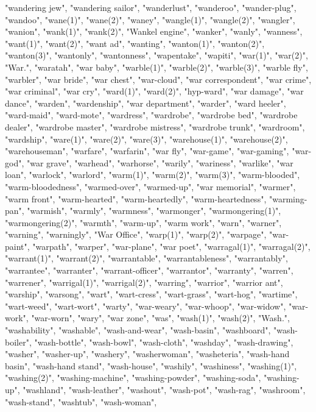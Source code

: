 "wandering jew",
"wandering sailor",
"wanderlust",
"wanderoo",
"wander-plug",
"wandoo",
"wane(1)",
"wane(2)",
"waney",
"wangle(1)",
"wangle(2)",
"wangler",
"wanion",
"wank(1)",
"wank(2)",
"Wankel engine",
"wanker",
"wanly",
"wanness",
"want(1)",
"want(2)",
"want ad",
"wanting",
"wanton(1)",
"wanton(2)",
"wanton(3)",
"wantonly",
"wantonness",
"wapentake",
"wapiti",
"war(1)",
"war(2)",
"War.",
"waratah",
"war baby",
"warble(1)",
"warble(2)",
"warble(3)",
"warble fly",
"warbler",
"war bride",
"war chest",
"war-cloud",
"war correspondent",
"war crime",
"war criminal",
"war cry",
"ward(1)",
"ward(2)",
"hyp-ward",
"war damage",
"war dance",
"warden",
"wardenship",
"war department",
"warder",
"ward heeler",
"ward-maid",
"ward-mote",
"wardress",
"wardrobe",
"wardrobe bed",
"wardrobe dealer",
"wardrobe master",
"wardrobe mistress",
"wardrobe trunk",
"wardroom",
"wardship",
"ware(1)",
"ware(2)",
"ware(3)",
"warehouse(1)",
"warehouse(2)",
"warehouseman",
"warfare",
"warfarin",
"war fly",
"war-game",
"war-gaming",
"war-god",
"war grave",
"warhead",
"warhorse",
"warily",
"wariness",
"warlike",
"war loan",
"warlock",
"warlord",
"warm(1)",
"warm(2)",
"warm(3)",
"warm-blooded",
"warm-bloodedness",
"warmed-over",
"warmed-up",
"war memorial",
"warmer",
"warm front",
"warm-hearted",
"warm-heartedly",
"warm-heartedness",
"warming-pan",
"warmish",
"warmly",
"warmness",
"warmonger",
"warmongering(1)",
"warmongering(2)",
"warmth",
"warm-up",
"warm work",
"warn",
"warner",
"warning",
"warningly",
"War Office",
"warp(1)",
"warp(2)",
"warpage",
"war-paint",
"warpath",
"warper",
"war-plane",
"war poet",
"warragal(1)",
"warragal(2)",
"warrant(1)",
"warrant(2)",
"warrantable",
"warrantableness",
"warrantably",
"warrantee",
"warranter",
"warrant-officer",
"warrantor",
"warranty",
"warren",
"warrener",
"warrigal(1)",
"warrigal(2)",
"warring",
"warrior",
"warrior ant",
"warship",
"warsong",
"wart",
"wart-cress",
"wart-grass",
"wart-hog",
"wartime",
"wart-weed",
"wart-wort",
"warty",
"war-weary",
"war-whoop",
"war-widow",
"war-work",
"war-worn",
"wary",
"war zone",
"was",
"wash(1)",
"wash(2)",
"Wash.",
"washability",
"washable",
"wash-and-wear",
"wash-basin",
"washboard",
"wash-boiler",
"wash-bottle",
"wash-bowl",
"wash-cloth",
"washday",
"wash-drawing",
"washer",
"washer-up",
"washery",
"washerwoman",
"washeteria",
"wash-hand basin",
"wash-hand stand",
"wash-house",
"washily",
"washiness",
"washing(1)",
"washing(2)",
"washing-machine",
"washing-powder",
"washing-soda",
"washing-up",
"washland",
"wash-leather",
"washout",
"wash-pot",
"wash-rag",
"washroom",
"wash-stand",
"washtub",
"wash-woman",
